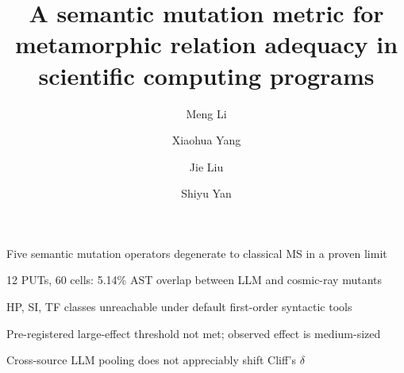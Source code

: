 \documentclass[review,12pt,authoryear]{elsarticle}
\begin{document}
\begin{frontmatter}

\title{A semantic mutation metric for metamorphic relation adequacy in scientific computing programs}

\author[a,b,c]{Meng Li}
\author[a,b,c]{Xiaohua Yang}
\author[a,b,c]{Jie Liu}
\author[a,b,c]{Shiyu Yan}



\begin{highlights}
\item Five semantic mutation operators degenerate to classical MS in a proven limit
\item 12 PUTs, 60 cells: 5.14\% AST overlap between LLM and cosmic-ray mutants
\item HP, SI, TF classes unreachable under default first-order syntactic tools
\item Pre-registered large-effect threshold not met; observed effect is medium-sized
\item Cross-source LLM pooling does not appreciably shift Cliff's $\delta$
\end{highlights}


\end{frontmatter}
\end{document}
